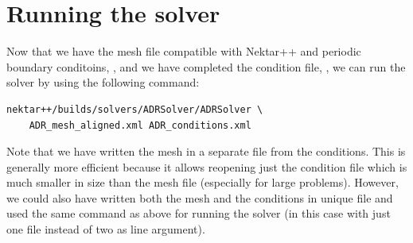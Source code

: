 \section{Running the solver}
\label{adr-running}
Now that we have the mesh file compatible with Nektar++ and periodic boundary conditoins, 
, and we have completed the condition file, , 
we can run the solver by using the following command:
%
\begin{lstlisting}[style=BashInputStyle]
nektar++/builds/solvers/ADRSolver/ADRSolver \
    ADR_mesh_aligned.xml ADR_conditions.xml
\end{lstlisting}
%
Note that we have written the mesh in a separate file from the conditions. This is generally more efficient 
because it allows reopening just the condition file which is much smaller in size than the mesh file (especially 
for large problems). However, we could also have written both the mesh and the conditions in unique file and 
used the same command as above for running the solver (in this case with just one file instead of two as line 
argument).

